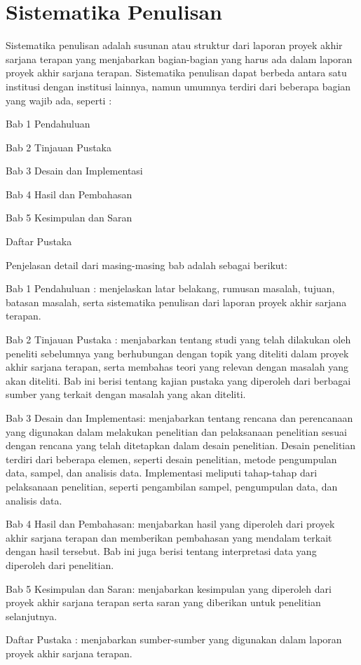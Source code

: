 \section{Sistematika Penulisan}
Sistematika penulisan adalah susunan atau struktur dari laporan proyek akhir sarjana terapan yang menjabarkan bagian-bagian yang harus ada dalam laporan proyek akhir sarjana terapan. Sistematika penulisan dapat berbeda antara satu institusi dengan institusi lainnya, namun umumnya terdiri dari beberapa bagian yang wajib ada, seperti :

\begin{packed_item}
    \item Bab 1 Pendahuluan
    \item Bab 2 Tinjauan Pustaka
    \item Bab 3 Desain dan Implementasi
    \item Bab 4 Hasil dan Pembahasan
    \item Bab 5 Kesimpulan dan Saran
    \item Daftar Pustaka
\end{packed_item}

Penjelasan detail dari masing-masing bab adalah sebagai berikut:

\begin{packed_enum}
    \item Bab 1 Pendahuluan : menjelaskan latar belakang, rumusan masalah, tujuan, batasan masalah, serta sistematika penulisan dari laporan proyek akhir sarjana terapan.
    \item Bab 2 Tinjauan Pustaka : menjabarkan tentang studi yang telah dilakukan oleh peneliti sebelumnya yang berhubungan dengan topik yang diteliti dalam proyek akhir sarjana terapan, serta membahas teori yang relevan dengan masalah yang akan diteliti. Bab ini berisi tentang kajian pustaka yang diperoleh dari berbagai sumber yang terkait dengan masalah yang akan diteliti.
    \item Bab 3 Desain dan Implementasi: menjabarkan tentang rencana dan perencanaan yang digunakan dalam melakukan penelitian dan pelaksanaan penelitian sesuai dengan rencana yang telah ditetapkan dalam desain penelitian. Desain penelitian terdiri dari beberapa elemen, seperti desain penelitian, metode pengumpulan data, sampel, dan analisis data. Implementasi meliputi tahap-tahap dari pelaksanaan penelitian, seperti pengambilan sampel, pengumpulan data, dan analisis data.
    \item Bab 4 Hasil dan Pembahasan: menjabarkan hasil yang diperoleh dari proyek akhir sarjana terapan dan memberikan pembahasan yang mendalam terkait dengan hasil tersebut. Bab ini juga berisi tentang interpretasi data yang diperoleh dari penelitian.
    \item Bab 5 Kesimpulan dan Saran: menjabarkan kesimpulan yang diperoleh dari proyek akhir sarjana terapan serta saran yang diberikan untuk penelitian selanjutnya.
    \item Daftar Pustaka : menjabarkan sumber-sumber yang digunakan dalam laporan proyek akhir sarjana terapan.
\end{packed_enum}

